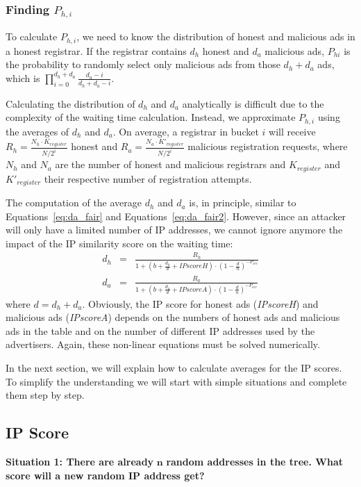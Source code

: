 \subsubsection{Finding $P_{h,i}$}

To calculate $P_{h,i}$, we need to know the distribution of honest and malicious ads in a honest registrar.
If the registrar contains $d_h$ honest and $d_a$ malicious ads, $P_{hi}$ is the probability to randomly select only malicious ads from those $d_h+d_a$ ads, which is $\prod_{i=0}^{d_h+d_a} \frac{d_a - i}{d_h+d_a-i}$.

Calculating the distribution of $d_h$ and $d_a$ analytically is difficult due to the complexity of the waiting time calculation. Instead, we approximate $P_{h,i}$ using the averages of $d_h$ and $d_a$.
On average, a registrar in bucket $i$ will receive $R_h = \frac{N_h\cdot K_\textit{register}}{N/2^i}$ honest and $R_a = \frac{N_a\cdot K'_\textit{register}}{N/2^i}$ malicious registration requests, where $N_h$ and $N_a$ are the number of honest and malicious registrars and $K_\textit{register}$ and $K'_\textit{register}$ their respective number of registration attempts.

The computation of the average $d_h$ and $d_a$ is, in principle, similar to Equations~\ref{eq:da_fair} and Equations~\ref{eq:da_fair2}. However, since an attacker will only have a limited number of IP addresses, we cannot ignore anymore the impact of the IP similarity score on the waiting time:
\begin{eqnarray}
d_h & = & \frac{R_h}{1 + (b + \frac{d_h}{d} + \textit{IPscoreH}) \cdot (1 - \frac{d}{n})^{-P_\textit{occ}}}\\
d_a & = & \frac{R_a}{1 + (b + \frac{d_a}{d} + \textit{IPscoreA}) \cdot (1 - \frac{d}{n})^{-P_\textit{occ}}}
\end{eqnarray}
where $d = d_h + d_a$. Obviously, the IP score for honest ads (\textit{IPscoreH}) and malicious ads (\textit{IPscoreA}) depends on the numbers of honest ads and malicious ads in the table and on the number of different IP addresses used by the advertisers. Again, these non-linear equations must be solved numerically.

In the next section, we will explain how to calculate averages for the IP scores. To simplify the understanding we will start with simple situations and complete them step by step.

\subsection{IP Score}
\textbf{Situation 1: There are already} \(\mathbf{n}\) \textbf{random
addresses in the tree. What score will a new random IP address get?}

